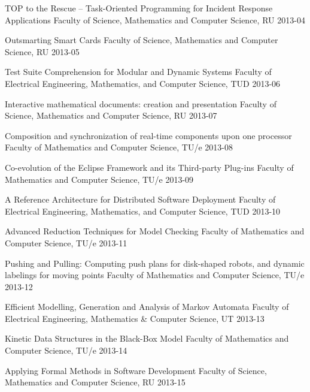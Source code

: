 \begin{multicols}{2}
         {TOP to the Rescue -- Task-Oriented Programming for Incident Response Applications}
         {Faculty of Science, Mathematics and Computer Science, RU}
         {2013-04}

         {Outsmarting Smart Cards}
         {Faculty of Science, Mathematics and Computer Science, RU}
         {2013-05}

         {Test Suite Comprehension for Modular and Dynamic Systems}
         {Faculty of Electrical Engineering, Mathematics, and Computer Science, TUD}
         {2013-06}

         {Interactive mathematical documents: creation and presentation}
         {Faculty of Science, Mathematics and Computer Science, RU}
         {2013-07}

         {Composition and synchronization of real-time components upon one processor}
         {Faculty of Mathematics and Computer Science, TU/e}
         {2013-08}

         {Co-evolution of the Eclipse Framework and its Third-party Plug-ins}
         {Faculty of Mathematics and Computer Science, TU/e}
         {2013-09}

         {A Reference Architecture for Distributed Software Deployment}
         {Faculty of Electrical Engineering, Mathematics, and Computer Science, TUD}
         {2013-10}

         {Advanced Reduction Techniques for Model Checking}
         {Faculty of Mathematics and Computer Science, TU/e}
         {2013-11}

         {Pushing and Pulling: Computing push plans for disk-shaped robots, and dynamic labelings for moving points}
         {Faculty of Mathematics and Computer Science, TU/e}
         {2013-12}

         {Efficient Modelling, Generation and Analysis of Markov Automata}
         {Faculty of Electrical Engineering, Mathematics \& Computer Science, UT}
         {2013-13}
 
         {Kinetic Data Structures in the Black-Box Model}
         {Faculty of Mathematics and Computer Science, TU/e}
         {2013-14}

         {Applying Formal Methods in Software Development}
         {Faculty of Science, Mathematics and Computer Science, RU}
         {2013-15}


\end{multicols}
